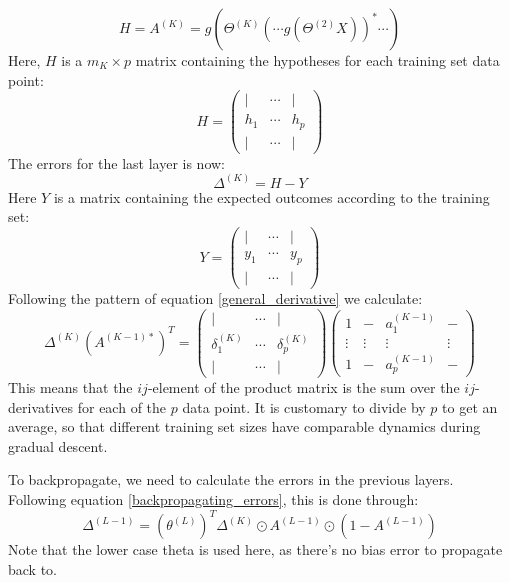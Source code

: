 \documentclass[12pt, a4paper]{article}
\numberwithin{equation}{section}
\begin{document}
\begin{equation}
H=A^{(K)}=g\left(\Theta^{(K)}\left(\cdots g(\Theta^{(2)}X)\right)^*\cdots\right)
\end{equation}
Here, $H$ is a $m_K\times p$ matrix containing the hypotheses for each training set data point:
\begin{equation}
H=
\begin{pmatrix}
|	&	\cdots	& |	\\
h_1	&	\cdots	& h_p \\
|	&	\cdots	& |
\end{pmatrix}
\end{equation}
The errors for the last layer is now:
\begin{equation}
\Delta^{(K)}=H-Y
\end{equation}
Here $Y$ is a matrix containing the expected outcomes according to the training set:
\begin{equation}
\label{y_vector}
Y=
\begin{pmatrix}
|	&	\cdots	& |	\\
y_1	&	\cdots	& y_p \\
|	&	\cdots	& |
\end{pmatrix}
\end{equation}
Following the pattern of equation \ref{general_derivative} we calculate:
\begin{equation}
\Delta^{(K)}\left(A^{(K-1)*}\right)^T=\begin{pmatrix}
|	&	\cdots	& |	\\
\delta^{(K)}_1	&	\cdots	& \delta^{(K)}_p \\
|	&	\cdots	& |
\end{pmatrix}
\begin{pmatrix}
1 & -	& a^{(K-1)}_1	&	- \\
\vdots & \vdots	& \vdots	& \vdots \\
1 & -	& a^{(K-1)}_p	&	-
\end{pmatrix}
\end{equation}
This means that the $ij$-element of the product matrix is the sum over the $ij$-derivatives for each of the $p$ data point. It is customary to divide by $p$ to get an average, so that different training set sizes have comparable dynamics during gradual descent.

To backpropagate, we need to calculate the errors in the previous layers. Following equation \ref{backpropagating_errors}, this is done through:
\begin{equation}
\Delta^{(L-1)}=\left(\theta^{(L)}\right)^T\Delta^{(K)}\odot A^{(L-1)}\odot(1-A^{(L-1)})
\end{equation}
Note that the lower case theta is used here, as there's no bias error to propagate back to.
\end{document}
